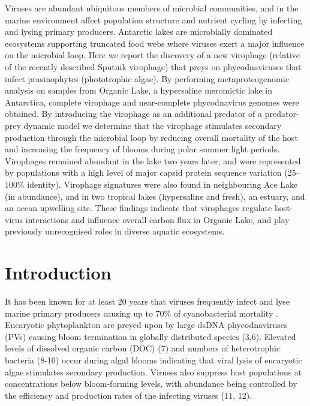 Viruses are abundant ubiquitous members of microbial communities, and in the marine environment affect population structure and nutrient cycling by infecting and lysing primary producers. 
Antarctic lakes are microbially dominated ecosystems supporting truncated food webs where viruses exert a major influence on the microbial loop. 
Here we report the discovery of a new virophage (relative of the recently described Sputnik virophage) that preys on phycodnaviruses that infect prasinophytes (phototrophic algae). 
By performing metaproteogenomic analysis on samples from Organic Lake, a hypersaline meromictic lake in Antarctica, complete virophage and near-complete phycodnavirus genomes were obtained. 
By introducing the virophage as an additional predator of a predator-prey dynamic model we determine that the virophage stimulates secondary production through the microbial loop by reducing overall mortality of the host and increasing the frequency of blooms during polar summer light periods. 
Virophages remained abundant in the lake two years later, and were represented by populations with a high level of major capsid protein sequence variation (25--100\% identity). 
Virophage signatures were also found in neighbouring Ace Lake (in abundance), and in two tropical lakes (hypersaline and fresh), an estuary, and an ocean upwelling site. 
These findings indicate that virophages regulate host-virus interactions and influence overall carbon flux in Organic Lake, and play previously unrecognised roles in diverse aquatic ecosystems.
\newpage


\section{Introduction}
It has been known for at least 20 years that viruses frequently infect and lyse marine primary producers causing up to 70\% of cyanobacterial mortality \cite{Proctor1990,Suttle1990}.
Eucaryotic phytoplankton are preyed upon by large dsDNA phycodnaviruses (PVs) causing bloom termination in globally distributed species (3,6).
Elevated levels of dissolved organic carbon (DOC) (7) and numbers of heterotrophic bacteria (8-10) occur during algal blooms indicating that viral lysis of eucaryotic algae stimulates secondary production. 
Viruses also suppress host populations at concentrations below bloom-forming levels, with abundance being controlled by the efficiency and production rates of the infecting viruses (11, 12). 

